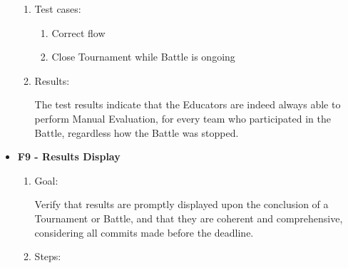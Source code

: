 \documentclass{Configuration_Files/Template}
\begin{document}
\begin{itemize}
\begin{enumerate}
        \item Test cases:
        
        \begin{enumerate}
        
            \item Correct flow
            \item Close Tournament while Battle is ongoing
             
        \end{enumerate}
        
        \item Results:
        
        The test results indicate that the Educators are indeed always able to perform Manual Evaluation, for every team who participated in the Battle, regardless how the Battle was stopped.\\
    
    \end{enumerate}

    \item \textbf{F9 - Results Display}
    
    \begin{enumerate}
    
        \item Goal:
        
        Verify that results are promptly displayed upon the conclusion of a Tournament or Battle, and that they are coherent and comprehensive, considering all commits made before the deadline.
        
        \item Steps:
        

\end{enumerate}
\end{itemize}
\end{document}
